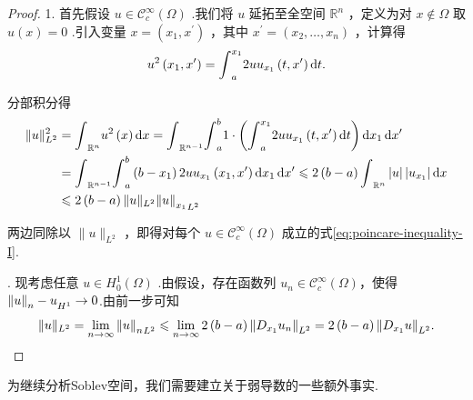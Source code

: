 \begin{proof}
1. 首先假设 $u \in  {\mathcal{C}}_{c}^{\infty }\left( \Omega \right)$ .我们将 $u$ 延拓至全空间 ${\mathbb{R}}^{n}$ ，定义为对 $x \notin  \Omega$ 取 $u\left( x\right)  = 0$ .引入变量 $x = \left( {{x}_{1},{x}^{\prime }}\right)$ ，其中 ${x}^{\prime } = \left( {{x}_{2},\ldots ,{x}_{n}}\right)$ ，计算得
\[
{u}^{2}\left( {{x}_{1},{x}^{\prime }}\right)  = {\int }_{a}^{{x}_{1}}{2u}{u}_{{x}_{1}}\left( {t,{x}^{\prime }}\right) {\mathop{}\!\mathrm{d} t}.
\]

分部积分得
{\setjot[-2]\begin{align*}
    \| u{\| }_{{L}^{2}}^{2} &= {\int }_{{\mathbb{R}}^{n}}{u}^{2}\left( x\right) {\mathop{}\!\mathrm{d} x} = {\int }_{{\mathbb{R}}^{n - 1}}{\int }_{a}^{b}1 \cdot  \left( {{\int }_{a}^{{x}_{1}}{2u}{u}_{{x}_{1}}\left( {t,{x}^{\prime }}\right) {\mathop{}\!\mathrm{d} t}}\right) \mathop{}\!\mathrm{d} x_{1}\mathop{}\!\mathrm{d} x^{\prime }\\
    &= {\int }_{{\mathbb{R}}^{n - 1}}{\int }_{a}^{b}\left( {b - {x}_{1}}\right) {2u}{u}_{{x}_{1}}\left( {{x}_{1},{x}^{\prime }}\right) \mathop{}\!\mathrm{d} x_{1}\mathop{}\!\mathrm{d} x^{\prime } \leqslant  2\left( {b - a}\right) {\int }_{{\mathbb{R}}^{n}}\left| u\right| \left| {u}_{{x}_{1}}\right| {\mathop{}\!\mathrm{d} x}\\
    &\leqslant  2\left( {b - a}\right) \| u{\| }_{{L}^{2}}{\norm{u}_{{x}_{1}}}_{{L}^{2}}
\end{align*}}


两边同除以 $\| u{\| }_{{L}^{2}}$ ，即得对每个 $u \in  {\mathcal{C}}_{c}^{\infty }\left( \Omega \right)$ 成立的式\eqref{eq:poincare-inequality-I}.

. 现考虑任意 $u \in  {H}_{0}^{1}\left( \Omega \right)$ .由假设，存在函数列 ${u}_{n} \in  {\mathcal{C}}_{c}^{\infty }\left( \Omega \right)$，使得 ${\norm{u}_{n} - u}_{{H}^{1}} \rightarrow  0$.由前一步可知
\[
\| u{\| }_{{L}^{2}} = \mathop{\lim }\limits_{{n \rightarrow  \infty }}{\norm{u}_{n}}_{{L}^{2}} \leqslant  \mathop{\lim }\limits_{{n \rightarrow  \infty }}2\left( {b - a}\right) {\norm{D_{{x}_{1}}{u}_{n}}}_{{L}^{2}} = 2\left( {b - a}\right) {\norm{D_{{x}_{1}}u}}_{{L}^{2}}.\qedhere
\]
\end{proof}

为继续分析Soblev空间，我们需要建立关于弱导数的一些额外事实.

